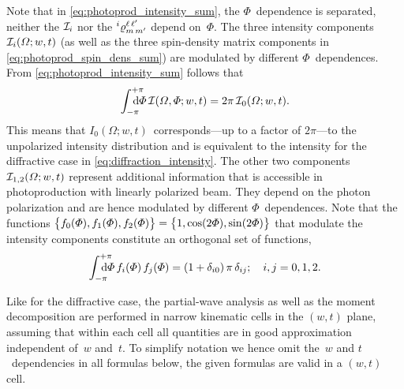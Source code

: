 Note that in \cref{eq:photoprod_intensity_sum}, the $\Phi$~dependence
is separated, \ie neither the $\mathcal{I}_i$ nor the
$\prescript{i}{}{\varrho}^{\ell\, \ell'}_{m\, m'}$ depend on~$\Phi$.
The three intensity components $\mathcal{I}_i(\Omega; w, t)$ (as well
as the three spin-density matrix components in
\cref{eq:photoprod_spin_dens_sum}) are modulated by different
$\Phi$~dependences.  From \cref{eq:photoprod_intensity_sum} follows
that
\begin{equation}
  \label{eq:photoprod_unpolarized_intensity}
  \int_{-\pi}^{+\pi}\hspace{-1.2em} \dif{\Phi}\, \intensity(\Omega, \Phi; w, t)
  = 2 \pi\, \intensity_0(\Omega; w, t).
\end{equation}
This means that $I_0(\Omega; w, t)$~corresponds---up to a factor of $2
\pi$---to the unpolarized intensity distribution and is equivalent to
the intensity for the diffractive case in
\cref{eq:diffraction_intensity}.  The other two components
$\mathcal{I}_{1, 2}(\Omega; w, t)$ represent additional information
that is accessible in photoproduction with linearly polarized beam.
They depend on the photon polarization and are hence modulated by
different $\Phi$~dependences.  Note that the functions
$\cBrk[1]{f_0(\Phi), f_1(\Phi), f_2(\Phi)} = \cBrk[1]{1, \cos(2 \Phi),
\sin(2 \Phi)}$ that modulate the intensity components constitute an
orthogonal set of functions, \ie
\begin{equation}
  \label{eq:photoprod_orthogonality_phi}
  \int_{-\pi}^{+\pi}\hspace{-1.2em} \dif{\Phi}\, f_i(\Phi)\, f_j(\Phi)
  = (1 + \delta_{i 0})\, \pi\, \delta_{i j};
  \quad i, j = 0 ,1, 2.
\end{equation}

Like for the diffractive case, the partial-wave analysis as well as
the moment decomposition are performed in narrow kinematic cells in
the $(w, t)$ plane, assuming that within each cell all quantities are
in good approximation independent of~$w$ and~$t$.  To simplify
notation we hence omit the~$w$ and $t$~dependencies in all formulas
below, \ie the given formulas are valid in a $(w, t)$ cell.

